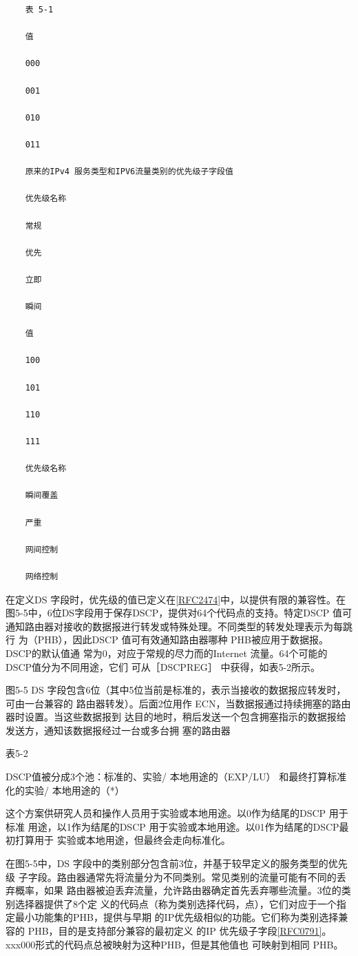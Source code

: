 \begin{verbatim}
    表 5-1

    值

    000

    001

    010

    011

    原来的IPv4 服务类型和IPV6流量类别的优先级子字段值

    优先级名称

    常规

    优先

    立即

    瞬间

    值

    100

    101

    110

    111

    优先级名称

    瞬间覆盖

    严重

    网间控制

    网络控制
\end{verbatim}

在定义DS
字段时，优先级的值已定义在\href{https://www.rfc-editor.org/rfc/rfc2474}{[RFC2474]}中，以提供有限的兼容性。在
图5-5中，6位DS字段用于保存DSCP，提供对64个代码点的支持。特定DSCP 值可
通知路由器对接收的数据报进行转发或特殊处理。不同类型的转发处理表示为每跳行
为（PHB），因此DSCP 值可有效通知路由器哪种 PHB被应用于数据报。DSCP的默认值通
常为0，对应于常规的尽力而的Internet 流量。64个可能的DSCP值分为不同用途，它们
可从［DSCPREG］ 中获得，如表5-2所示。

图5-5 DS 字段包含6位（其中5位当前是标准的，表示当接收的数据报应转发时，可由一台兼容的
路由器转发）。后面2位用作 ECN，当数据报通过持续拥塞的路由器时设置。当这些数据报到
达目的地时，稍后发送一个包含拥塞指示的数据报给发送方，通知该数据报经过一台或多台拥
塞的路由器

表5-2

DSCP值被分成3个池：标准的、实验/ 本地用途的（EXP/LU）
和最终打算标准化的实验/ 本地用途的（*）

这个方案供研究人员和操作人员用于实验或本地用途。以0作为结尾的DSCP 用于标准
用途，以1作为结尾的DSCP 用于实验或本地用途。以01作为结尾的DSCP最初打算用于
实验或本地用途，但最终会走向标准化。

在图5-5中，DS 字段中的类别部分包含前3位，并基于较早定义的服务类型的优先级
子字段。路由器通常先将流量分为不同类别。常见类别的流量可能有不同的丢弃概率，如果
路由器被迫丢弃流量，允许路由器确定首先丢弃哪些流量。3位的类别选择器提供了8个定
义的代码点（称为类别选择代码，点），它们对应于一个指定最小功能集的PHB，提供与早期
的IP优先级相似的功能。它们称为类别选择兼容的 PHB，目的是支持部分兼容的最初定义
的IP
优先级子字段\href{https://www.rfc-editor.org/rfc/rfc0791}{[RFC0791]}。xxx000形式的代码点总被映射为这种PHB，但是其他值也
可映射到相同 PHB。

